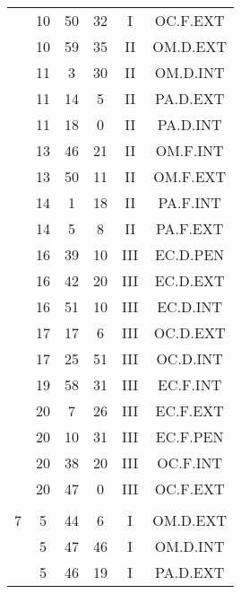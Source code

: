 \documentclass[12pt, a4paper]{article}
\begin{document}
\begin{multicols}{3}
{\begin{tabular}{c c c c c c}
	 	 	 	 & 10 & 50 & 32 & I & OC.F.EXT\\%
	 	 	 	 & 10 & 59 & 35 & II & OM.D.EXT\\%
	 	 	 	 & 11 & 3 & 30 & II & OM.D.INT\\%
	 	 	 	 & 11 & 14 & 5 & II & PA.D.EXT\\%
	 	 	 	 & 11 & 18 & 0 & II & PA.D.INT\\%
	 	 	 	 & 13 & 46 & 21 & II & OM.F.INT\\%
	 	 	 	 & 13 & 50 & 11 & II & OM.F.EXT\\%
	 	 	 	 & 14 & 1 & 18 & II & PA.F.INT\\%
	 	 	 	 & 14 & 5 & 8 & II & PA.F.EXT\\%
	 	 	 	 & 16 & 39 & 10 & III & EC.D.PEN\\%
	 	 	 	 & 16 & 42 & 20 & III & EC.D.EXT\\%
	 	 	 	 & 16 & 51 & 10 & III & EC.D.INT\\%
	 	 	 	 & 17 & 17 & 6 & III & OC.D.EXT\\%
	 	 	 	 & 17 & 25 & 51 & III & OC.D.INT\\%
	 	 	 	 & 19 & 58 & 31 & III & EC.F.INT\\%
	 	 	 	 & 20 & 7 & 26 & III & EC.F.EXT\\%
	 	 	 	 & 20 & 10 & 31 & III & EC.F.PEN\\%
	 	 	 	 & 20 & 38 & 20 & III & OC.F.INT\\%
	 	 	 	 & 20 & 47 & 0 & III & OC.F.EXT\\%
	 	 	 	 & & & & & \\%
	 	 	 	7 & 5 & 44 & 6 & I & OM.D.EXT\\%
	 	 	 	 & 5 & 47 & 46 & I & OM.D.INT\\%
	 	 	 	 & 5 & 46 & 19 & I & PA.D.EXT\\%

\end{tabular}}
\end{multicols}
\end{document}
